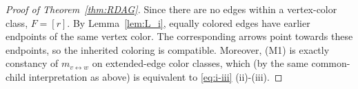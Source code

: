 \documentclass[10pt,a4paper]{amsart}
\newcommand{\1}{\mathbf{1}}
\theoremstyle{plain}
\theoremstyle{definition}
\theoremstyle{remark}
\begin{document}
\begin{proof}[Proof of Theorem~\ref{thm:RDAG}]
Since there are no edges within a vertex-color class, $F=[r]$.
By Lemma~\ref{lem:L_i}, equally colored edges have earlier endpoints of the same vertex color.
The corresponding arrows point towards these endpoints,
so the inherited coloring is compatible.
Moreover, (M1) is exactly constancy of $m_{v\leftrightarrow w}$ on extended-edge color classes, which (by the same common-child
interpretation as above) is equivalent to \eqref{eq:i-iii} (ii)-(iii).
\end{proof}
\end{document}
